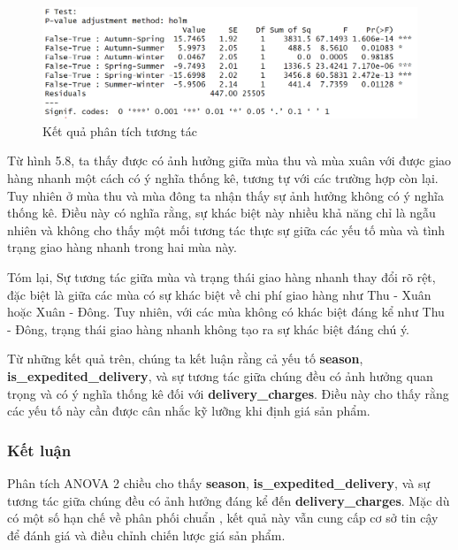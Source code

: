\begin{figure}[!htbp]
    \centering
    \includegraphics[width=1\linewidth]{graphics/5.7.1.2.png}
    \caption{Kết quả phân tích tương tác}
    \label{fig:5.7.1.2}
\end{figure}
Từ hình 5.8, ta thấy được có ảnh hưởng giữa mùa thu và mùa xuân với được giao hàng nhanh một cách có ý nghĩa thống kê,
tương tự với các trường hợp còn lại. 
Tuy nhiên ở mùa thu và mùa đông ta nhận thấy sự ảnh hưởng không có ý nghĩa thống kê. Điều này có nghĩa rằng, sự khác biệt này nhiều khả năng chỉ là ngẫu nhiên và không cho thấy một mối tương tác thực sự giữa các yếu tố mùa và tình trạng giao hàng nhanh trong hai mùa này.    

Tóm lại, Sự tương tác giữa mùa và trạng thái giao hàng nhanh thay đổi rõ rệt, đặc biệt là giữa các mùa có sự khác biệt về chi phí giao hàng như Thu - Xuân hoặc Xuân - Đông. Tuy nhiên, với các mùa không có khác biệt đáng kể như Thu - Đông, trạng thái giao hàng nhanh không tạo ra sự khác biệt đáng chú ý.

Từ những kết quả trên, chúng ta kết luận rằng cả yếu tố \textbf{season}, \textbf{is\_expedited\_delivery}, và sự tương tác giữa chúng đều có ảnh hưởng quan trọng và có ý nghĩa thống kê đối với \textbf{delivery\_charges}. Điều này cho thấy rằng các yếu tố này cần được cân nhắc kỹ lưỡng khi định giá sản phẩm.
              
\subsubsection{Kết luận}
Phân tích ANOVA 2 chiều cho thấy \textbf{season}, \textbf{is\_expedited\_delivery}, và sự tương tác giữa chúng đều có ảnh hưởng đáng kể đến \textbf{delivery\_charges}. Mặc dù có một số hạn chế về phân phối chuẩn , kết quả này vẫn cung cấp cơ sở tin cậy để đánh giá và điều chỉnh chiến lược giá sản phẩm.